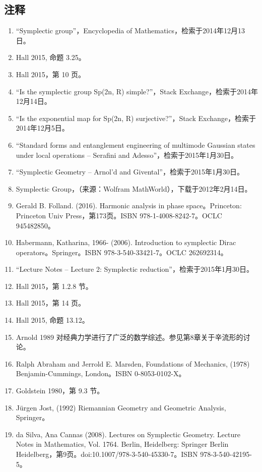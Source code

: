 \subsection{注释}
\begin{enumerate}
\item “Symplectic group”，Encyclopedia of Mathematics，检索于2014年12月13日。
\item Hall 2015, 命题 3.25。
\item Hall 2015，第 10 页。
\item “Is the symplectic group Sp(2n, R) simple?”，Stack Exchange，检索于2014年12月14日。
\item “Is the exponential map for Sp(2n, R) surjective?”，Stack Exchange，检索于2014年12月5日。
\item “Standard forms and entanglement engineering of multimode Gaussian states under local operations – Serafini and Adesso”，检索于2015年1月30日。
\item “Symplectic Geometry – Arnol'd and Givental”，检索于2015年1月30日。
\item Symplectic Group，（来源：Wolfram MathWorld），下载于2012年2月14日。
\item Gerald B. Folland. (2016). Harmonic analysis in phase space。Princeton: Princeton Univ Press，第173页。ISBN 978-1-4008-8242-7。OCLC 945482850。
\item Habermann, Katharina, 1966- (2006). Introduction to symplectic Dirac operators。Springer。ISBN 978-3-540-33421-7。OCLC 262692314。
\item “Lecture Notes – Lecture 2: Symplectic reduction”，检索于2015年1月30日。
\item Hall 2015，第 1.2.8 节。
\item Hall 2015，第 14 页。
\item Hall 2015, 命题 13.12。
\item Arnold 1989 对经典力学进行了广泛的数学综述。参见第8章关于辛流形的讨论。
\item Ralph Abraham and Jerrold E. Marsden, Foundations of Mechanics, (1978) Benjamin-Cummings, London。ISBN 0-8053-0102-X。
\item Goldstein 1980，第 9.3 节。
\item Jürgen Jost, (1992) Riemannian Geometry and Geometric Analysis, Springer。
\item da Silva, Ana Cannas (2008). Lectures on Symplectic Geometry. Lecture Notes in Mathematics, Vol. 1764. Berlin, Heidelberg: Springer Berlin Heidelberg，第9页。doi:10.1007/978-3-540-45330-7。ISBN 978-3-540-42195-5。
\end{enumerate}
